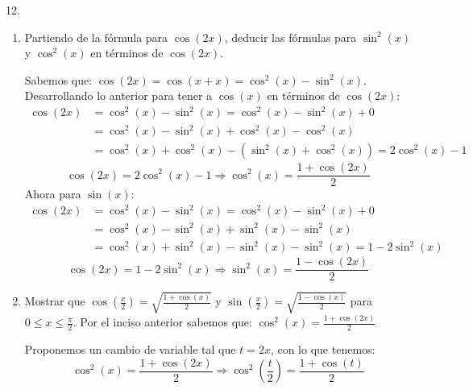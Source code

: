 \documentclass[12pt]{article}
\begin{document}
12.
\begin{enumerate}[\hspace{9px} a)]
    \item Partiendo de la f\'ormula para $\cos(2x)$, deducir las f\'ormulas para $\sin^2(x)$ y $\cos^2(x)$ en t\'erminos de $\cos(2x)$.\bigskip
    
        Sabemos que: \(\cos(2x)=\cos(x+x)=\cos^2(x)-\sin^2(x)\).\bigskip
        Desarrollando lo anterior para tener a $\cos(x)$ en t\'erminos de $\cos(2x)$:
        \begin{align*}
            \cos(2x) &= \cos^2(x)-\sin^2(x) = \cos^2(x)-\sin^2(x) + 0 \\
            &= \cos^2(x)-\sin^2(x) + \cos^2(x) - \cos^2(x) \\
            &= \cos^2(x) + \cos^2(x) -(\sin^2(x)+\cos^2(x)) = 2\cos^2(x)-1
        \end{align*}
        \begin{equation*}
            \cos(2x)= 2\cos^2(x)-1 \Longrightarrow \cos^2(x) = \frac{1+\cos(2x)}{2}
        \end{equation*}
        Ahora para $\sin(x)$:
        \begin{align*}
            \cos(2x) &= \cos^2(x)-\sin^2(x) = \cos^2(x)-\sin^2(x) + 0 \\
            &= \cos^2(x)-\sin^2(x) + \sin^2(x) - \sin^2(x) \\
            &= \cos^2(x)+\sin^2(x) - \sin^2(x) - \sin^2(x) = 1 - 2\sin^2(x)
        \end{align*}
        \begin{equation*}
            \cos(2x) = 1 - 2\sin^2(x) \Longrightarrow \sin^2(x) = \frac{1-\cos(2x)}{2}
        \end{equation*}

    \item Mostrar que \(\cos\left(\displaystyle\frac{x}{2}\right)=\sqrt{\frac{1+\cos(x)}{2}}\) y \(\sin\left(\displaystyle\frac{x}{2}\right)=\sqrt{\frac{1-\cos(x)}{2}}\) para \(0 \leq x \leq \displaystyle\frac{\pi}{2}\).\bigskip
        Por el inciso anterior sabemos que: \(\cos^2(x) = \displaystyle\frac{1+\cos(2x)}{2}\)\bigskip

        Proponemos un cambio de variable tal que \(t=2x\), con lo que tenemos:
        \[\cos^2(x) = \frac{1+\cos(2x)}{2} \Longrightarrow \cos^2\left(\displaystyle\frac{t}{2}\right)=\frac{1+\cos(t)}{2}\]


\end{enumerate}
\end{document}
